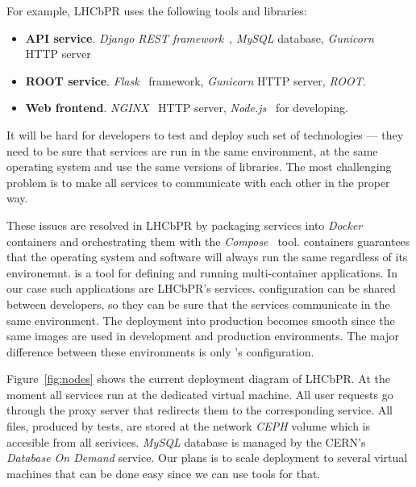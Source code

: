 \documentclass[a4paper]{jpconf}
\begin{document}
For example, LHCbPR uses the following tools and libraries:
\begin{itemize}
\item \textbf{API service}. \textit{Django REST framework}~\cite{rest}, \textit{MySQL}
database, \textit{Gunicorn}~\cite{gunicorn} HTTP server
\item \textbf{ROOT service}. \textit{Flask}~\cite{flask} framework, \textit{Gunicorn} HTTP server, \textit{ROOT}.
\item \textbf{Web frontend}. \textit{NGINX}~\cite{nginx} HTTP server, \textit{Node.js}~\cite{node} for developing.
\end{itemize}

It will be hard for developers to test and deploy  such set of technologies
--- they need to be sure that services are run in the same environment, at
the same operating system and use the same versions of libraries. The most
challenging problem is to make all services to communicate with each other in the proper way.

These issues are resolved in LHCbPR by packaging services into
\textit{Docker~\cite{docker}} containers and orchestrating them with the \docker
\textit{Compose~\cite{compose}} tool. \docker containers guarantees that the
operating system and software will always run the same regardless of its
environemnt. \compose is a tool for defining and running multi-container \docker
applications. In our case such applications are LHCbPR's services. \composes
configuration can be shared between developers, so they can be sure that the
services communicate in the same environment. The deployment into production
becomes  smooth since the same
\docker images are used in development and production environments. The major difference
 between these environments is only \composes's configuration.

Figure~\ref{fig:nodes} shows the current deployment diagram of LHCbPR. At the
moment all services run at the dedicated virtual machine. All user requests go
through the proxy server that redirects them to the corresponding service. All
files, produced by tests, are stored at the network \textit{CEPH} volume which
is accesible from all serivices.
\textit{MySQL} database is managed by the CERN's \textit{Database On Demand} service.
Our plans is  to scale deployment to several virtual machines that can be done easy since
we can use \docker tools for that.  
\end{document}
